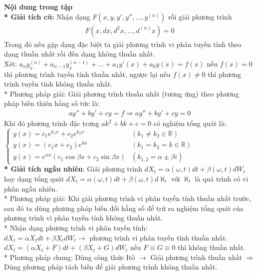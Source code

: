 \documentclass[14pt,a4paper]{article}
\numberwithin{equation}{section}
\begin{document}
\textbf{Nội dung trong tập}\\
\textbf{* Giải tích cũ:} Nhận dạng $F(x,y,y',y'',...,y^{(n)})$ rồi giải phương trình \begin{equation}
	\begin{aligned}
		F(x,dx,d^2x,...,d^{(n)}x)=0
	\end{aligned}
\end{equation}
Trong đó nếu gặp dạng đặc biệt ta giải phương trình vi phân tuyến tính theo dạng thuần nhất rồi đến dạng không thuần nhất.\\
Xét: $a_ny^{(n)}_x+a_{n-1}y^{(n-1)}_x+...+a_1y'(x)+a_0y(x)=f(x)$ nếu $f(x)=0$ thì phương trình tuyến tính thuần nhất, ngược lại nếu $f(x)\neq0$ thì phương trình tuyến tính không thuần nhất.\\
* Phương pháp giải: Giải phương trình thuần nhất (tương ứng) theo phương pháp biến thiên hằng số tức là:
\begin{gather*}
	ay''+by'+cy=f\Rightarrow ay''+by'+cy=0
\end{gather*}
Khi đó phương trình đặc trưng $ak^2+bk+c=0$ có nghiệm tổng quát là:\\
$\begin{cases} y(x)=c_1e^{k_1x}+c_2e^{k_2x} & (k_1\neq k_2 \in \mathbb{R}) \\ y(x)=(c_1x+c_2)e^{kx} & (k_1=k_2=k\in \mathbb{R}) \\ y(x)=e^{\alpha x}(c_1\cos{\beta x}+c_2\sin{\beta x}) & (k_{1,2}=\alpha \pm \beta i) \end{cases}$\\
\textbf{* Giải tích ngẫu nhiên}: Giải phương trình $dX_t=\alpha(\omega,t)dt+\beta(\omega,t)dW_t$ hay dạng tổng quát $dX_t=\alpha(\omega,t)dt+\beta(\omega,t)d\aleph_t$ với $\aleph_t$ là quá trình có vi phân ngẫu nhiên.\\
* Phương pháp giải: Khi giải phương trình vi phân tuyến tính thuần nhất trước, sau đó ta dùng phương pháp biến đổi hằng số để trừ ra nghiệm tổng quát của phương trình vi phân tuyến tính không thuần nhất.\\
* Nhận dạng phương trình vi phân tuyến tính:\\
$dX_t=\alpha X_tdt+\beta X_tdW_t \rightarrow$ phương trình vi phân tuyến tính thuần nhất.\\
$dX_t=(\alpha X_t+F)dt+(\beta X_t+G)dW_t$ nếu $F\equiv G \equiv 0$ thì không thuần nhất.\\
* Phương pháp chung: Dùng công thức Itô $\rightarrow$ Giải phương trình thuần nhất $\Rightarrow$ Dùng phương pháp tách biến để giải phương trình không thuần nhất.\\
\end{document}
